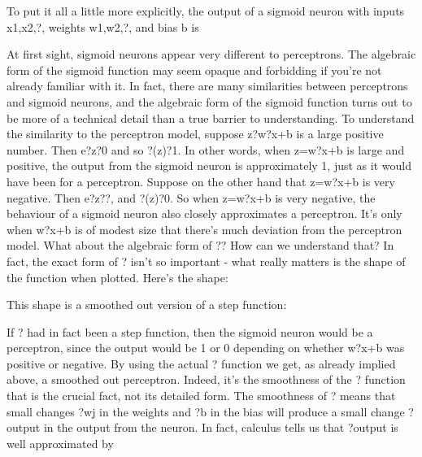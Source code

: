 To put it all a little more explicitly, the output of a sigmoid neuron with inputs x1,x2,?, weights w1,w2,?, and bias b is 

At first sight, sigmoid neurons appear very different to perceptrons. The algebraic form of the sigmoid function may seem opaque and forbidding if you're not already familiar with it. In fact, there are many similarities between perceptrons and sigmoid neurons, and the algebraic form of the sigmoid function turns out to be more of a technical detail than a true barrier to understanding.
To understand the similarity to the perceptron model, suppose z?w?x+b is a large positive number. Then e?z?0 and so ?(z)?1. In other words, when z=w?x+b is large and positive, the output from the sigmoid neuron is approximately 1, just as it would have been for a perceptron. Suppose on the other hand that z=w?x+b is very negative. Then e?z??, and ?(z)?0. So when z=w?x+b is very negative, the behaviour of a sigmoid neuron also closely approximates a perceptron. It's only when w?x+b is of modest size that there's much deviation from the perceptron model.
What about the algebraic form of ?? How can we understand that? In fact, the exact form of ? isn't so important - what really matters is the shape of the function when plotted. Here's the shape:

This shape is a smoothed out version of a step function:


If ? had in fact been a step function, then the sigmoid neuron would be a perceptron, since the output would be 1 or 0 depending on whether w?x+b was positive or negative. By using the actual ? function we get, as already implied above, a smoothed out perceptron. Indeed, it's the smoothness of the ? function that is the crucial fact, not its detailed form. The smoothness of ? means that small changes ?wj in the weights and ?b in the bias will produce a small change ?output in the output from the neuron. In fact, calculus tells us that ?output is well approximated by 

